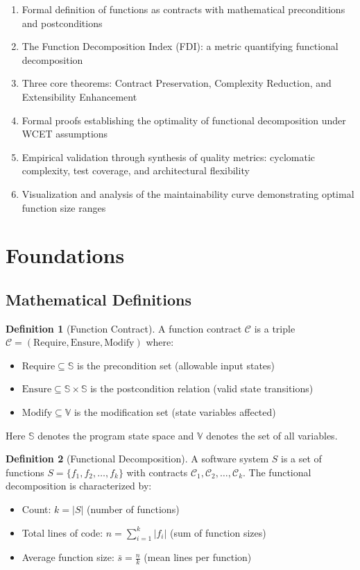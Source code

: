 \documentclass[a4paper,12pt]{article}
\theoremstyle{definition}
\newtheorem{definition}{Definition}
\begin{document}
\begin{enumerate}
	\item Formal definition of functions as contracts with mathematical preconditions and postconditions
	\item The Function Decomposition Index (FDI): a metric quantifying functional decomposition
	\item Three core theorems: Contract Preservation, Complexity Reduction, and Extensibility Enhancement
	\item Formal proofs establishing the optimality of functional decomposition under WCET assumptions
	\item Empirical validation through synthesis of quality metrics: cyclomatic complexity, test coverage, and architectural flexibility
	\item Visualization and analysis of the maintainability curve demonstrating optimal function size ranges
\end{enumerate}

\section{Foundations}

\subsection{Mathematical Definitions}

\begin{definition}[Function Contract]
A function contract $\mathcal{C}$ is a triple $\mathcal{C} = (\mathrm{Require}, \mathrm{Ensure}, \mathrm{Modify})$ where:
\begin{itemize}
	\item $\mathrm{Require} \subseteq \mathbb{S}$ is the precondition set (allowable input states)
	\item $\mathrm{Ensure} \subseteq \mathbb{S} \times \mathbb{S}$ is the postcondition relation (valid state transitions)
	\item $\mathrm{Modify} \subseteq \mathbb{V}$ is the modification set (state variables affected)
\end{itemize}
Here $\mathbb{S}$ denotes the program state space and $\mathbb{V}$ denotes the set of all variables.
\end{definition}

\begin{definition}[Functional Decomposition]
A software system $S$ is a set of functions $S = \{f_1, f_2, \ldots, f_k\}$ with contracts $\mathcal{C}_1, \mathcal{C}_2, \ldots, \mathcal{C}_k$. The functional decomposition is characterized by:
\begin{itemize}
	\item Count: $k = |S|$ (number of functions)
	\item Total lines of code: $n = \sum_{i=1}^{k} |f_i|$ (sum of function sizes)
	\item Average function size: $\bar{s} = \frac{n}{k}$ (mean lines per function)
\end{itemize}
\end{definition}
\end{document}
